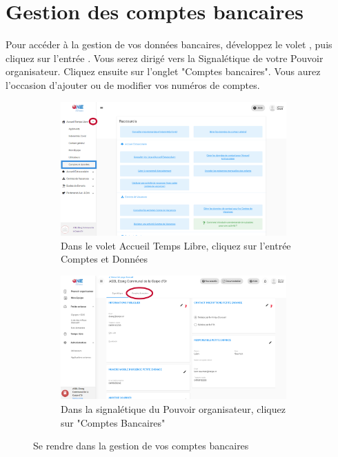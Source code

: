 \section{Gestion des comptes bancaires}
Pour accéder à la gestion de vos données bancaires, développez le volet , puis cliquez sur l'entrée . Vous serez dirigé vers la Signalétique de votre Pouvoir organisateur. Cliquez ensuite sur l'onglet "Comptes bancaires". Vous aurez l'occasion d'ajouter ou de modifier vos numéros de comptes. 

\begin{figure}[!h]
    \centering
    \begin{subfigure}[t]{0.48\textwidth}
         \centering
         \includegraphics[width=0.95\textwidth]{Images/gcb/gcb_atlas.png}
         \caption{Dans le volet Accueil Temps Libre, cliquez sur l'entrée Comptes et Données}
         \label{subfig:gcb_atlas}
     \end{subfigure}
     \hfill
    \begin{subfigure}[t]{0.48\textwidth}
         \centering
         \includegraphics[width=0.95\textwidth]{Images/gcb/gcb_signaletique.png}
         \caption{Dans la signalétique du Pouvoir organisateur, cliquez sur "Comptes Bancaires"}
         \label{subfig:gcb_signalétique}
     \end{subfigure}
    
    \caption{Se rendre dans la gestion de vos comptes bancaires}
    \label{fig:gcb_atlas}
\end{figure}

